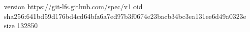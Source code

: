 version https://git-lfs.github.com/spec/v1
oid sha256:641bd59d176bd4cd64bfa6a7ed97b3f0674e23bacb34bc3ea131ee6d49a0323e
size 132850
